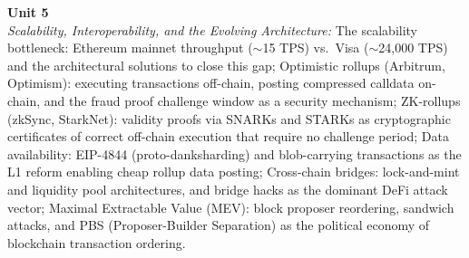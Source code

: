 \noindent\textbf{Unit 5} \\
\textit{Scalability, Interoperability, and the Evolving Architecture:} The scalability bottleneck: Ethereum mainnet throughput ($\sim$15 TPS) vs.\ Visa ($\sim$24,000 TPS) and the architectural solutions to close this gap; Optimistic rollups (Arbitrum, Optimism): executing transactions off-chain, posting compressed calldata on-chain, and the fraud proof challenge window as a security mechanism; ZK-rollups (zkSync, StarkNet): validity proofs via SNARKs and STARKs as cryptographic certificates of correct off-chain execution that require no challenge period; Data availability: EIP-4844 (proto-danksharding) and blob-carrying transactions as the L1 reform enabling cheap rollup data posting; Cross-chain bridges: lock-and-mint and liquidity pool architectures, and bridge hacks as the dominant DeFi attack vector; Maximal Extractable Value (MEV): block proposer reordering, sandwich attacks, and PBS (Proposer-Builder Separation) as the political economy of blockchain transaction ordering.

\newpage
{}